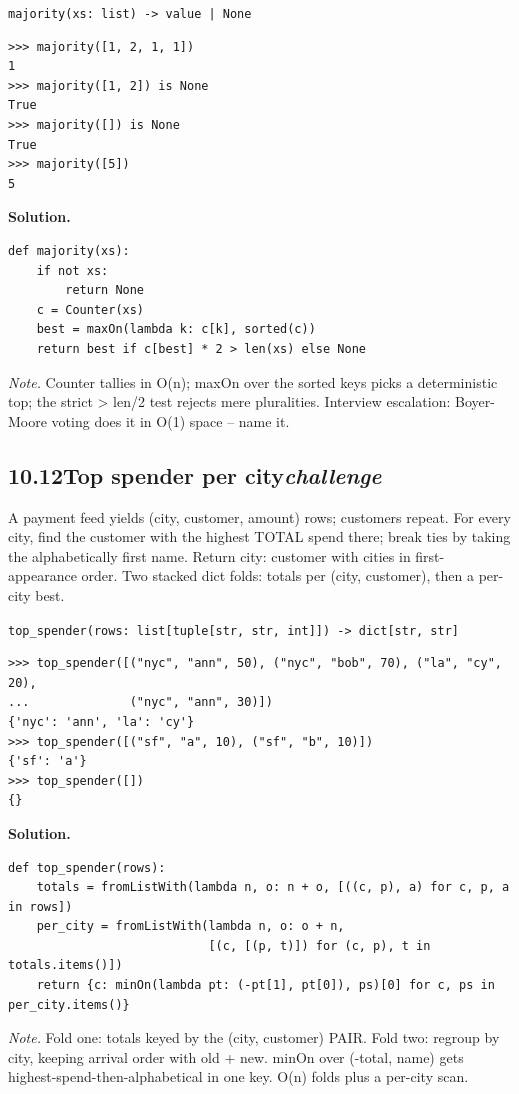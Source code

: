 \documentclass[10pt,letterpaper]{book}
\begin{document}
\noindent\texttt{majority(xs: list) -> value | None}
\begin{lstlisting}[style=ex]
>>> majority([1, 2, 1, 1])
1
>>> majority([1, 2]) is None
True
>>> majority([]) is None
True
>>> majority([5])
5
\end{lstlisting}
\noindent\textbf{Solution.}
\begin{lstlisting}[style=code]
def majority(xs):
    if not xs:
        return None
    c = Counter(xs)
    best = maxOn(lambda k: c[k], sorted(c))
    return best if c[best] * 2 > len(xs) else None
\end{lstlisting}
\noindent\textit{Note.} Counter tallies in O(n); maxOn over the sorted keys picks a deterministic top; the strict > len/2 test rejects mere pluralities. Interview escalation: Boyer-Moore voting does it in O(1) space -- name it.

\subsection*{10.12\quad Top spender per city\hfill\textnormal{\textit{challenge}}}
A payment feed yields (city, customer, amount) rows; customers repeat. For every city, find the customer with the highest TOTAL spend there; break ties by taking the alphabetically first name. Return {city: customer} with cities in first-appearance order. Two stacked dict folds: totals per (city, customer), then a per-city best.

\noindent\texttt{top\_spender(rows: list[tuple[str, str, int]]) -> dict[str, str]}
\begin{lstlisting}[style=ex]
>>> top_spender([("nyc", "ann", 50), ("nyc", "bob", 70), ("la", "cy", 20),
...              ("nyc", "ann", 30)])
{'nyc': 'ann', 'la': 'cy'}
>>> top_spender([("sf", "a", 10), ("sf", "b", 10)])
{'sf': 'a'}
>>> top_spender([])
{}
\end{lstlisting}
\noindent\textbf{Solution.}
\begin{lstlisting}[style=code]
def top_spender(rows):
    totals = fromListWith(lambda n, o: n + o, [((c, p), a) for c, p, a in rows])
    per_city = fromListWith(lambda n, o: o + n,
                            [(c, [(p, t)]) for (c, p), t in totals.items()])
    return {c: minOn(lambda pt: (-pt[1], pt[0]), ps)[0] for c, ps in per_city.items()}
\end{lstlisting}
\noindent\textit{Note.} Fold one: totals keyed by the (city, customer) PAIR. Fold two: regroup by city, keeping arrival order with old + new. minOn over (-total, name) gets highest-spend-then-alphabetical in one key. O(n) folds plus a per-city scan.
\end{document}
